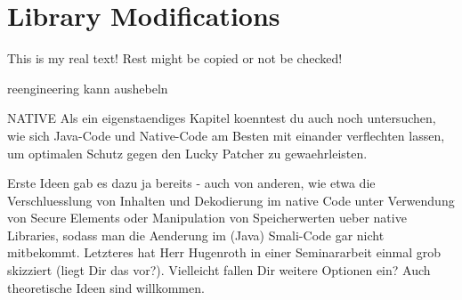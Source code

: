 \section{Library Modifications} \label{section:evaluation-modifications}
This is my real text! Rest might be copied or not be checked!




reengineering kann aushebeln


NATIVE
Als ein eigenstaendiges Kapitel koenntest du auch noch untersuchen, wie sich Java-Code und Native-Code am Besten mit einander verflechten lassen, um optimalen Schutz gegen den Lucky Patcher zu gewaehrleisten.


Erste Ideen gab es dazu ja bereits - auch von anderen, wie etwa die Verschluesslung von Inhalten und Dekodierung im native Code unter Verwendung von Secure Elements oder Manipulation von Speicherwerten ueber native Libraries, sodass man die Aenderung im (Java) Smali-Code gar nicht mitbekommt. Letzteres hat Herr Hugenroth in einer Seminararbeit einmal grob skizziert (liegt Dir das vor?). Vielleicht fallen Dir weitere Optionen ein? Auch theoretische Ideen sind willkommen.
